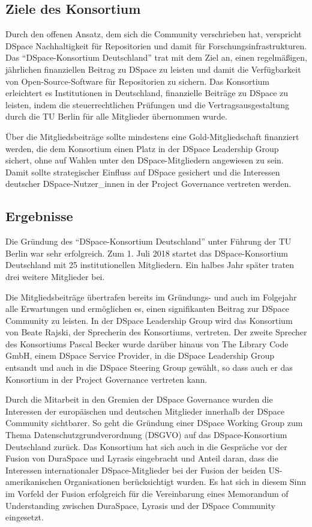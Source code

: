\documentclass[a4paper,
fontsize=11pt,
oneside,
numbers=noperiodatend,
parskip=half-,
bibliography=totoc,
final
]{scrartcl}
\begin{document}
\hypertarget{ziele-des-konsortium}{%
\subsection{Ziele des Konsortium}\label{ziele-des-konsortium}}

Durch den offenen Ansatz, dem sich die Community verschrieben hat,
verspricht DSpace Nachhaltigkeit für Repositorien und damit für
Forschungsinfrastrukturen. Das \enquote{DSpace-Konsortium Deutschland}
trat mit dem Ziel an, einen regelmäßigen, jährlichen finanziellen
Beitrag zu DSpace zu leisten und damit die Verfügbarkeit von
Open-Source-Software für Repositorien zu sichern. Das Konsortium
erleichtert es Institutionen in Deutschland, finanzielle Beiträge zu
DSpace zu leisten, indem die steuerrechtlichen Prüfungen und die
Vertragsausgestaltung durch die TU Berlin für alle Mitglieder übernommen
wurde.

Über die Mitgliedsbeiträge sollte mindestens eine Gold-Mitgliedschaft
finanziert werden, die dem Konsortium einen Platz in der DSpace
Leadership Group sichert, ohne auf Wahlen unter den DSpace-Mitgliedern
angewiesen zu sein. Damit sollte strategischer Einfluss auf DSpace
gesichert und die Interessen deutscher DSpace-Nutzer\_innen in der
Project Governance vertreten werden.

\hypertarget{ergebnisse}{%
\subsection{Ergebnisse}\label{ergebnisse}}

Die Gründung des \enquote{DSpace-Konsortium Deutschland} unter Führung
der TU Berlin war sehr erfolgreich. Zum 1. Juli 2018 startet das
DSpace-Konsortium Deutschland mit 25 institutionellen Mitgliedern. Ein
halbes Jahr später traten drei weitere Mitglieder bei.

Die Mitgliedsbeiträge übertrafen bereits im Gründungs- und auch im
Folgejahr alle Erwartungen und ermöglichen es, einen signifikanten
Beitrag zur DSpace Community zu leisten. In der DSpace Leadership Group
wird das Konsortium von Beate Rajski, der Sprecherin des Konsortiums,
vertreten. Der zweite Sprecher des Konsortiums Pascal Becker wurde
darüber hinaus von The Library Code GmbH, einem DSpace Service Provider,
in die DSpace Leadership Group entsandt und auch in die DSpace Steering
Group gewählt, so dass auch er das Konsortium in der Project Governance
vertreten kann.

Durch die Mitarbeit in den Gremien der DSpace Governance wurden die
Interessen der europäischen und deutschen Mitglieder innerhalb der
DSpace Community sichtbarer. So geht die Gründung einer DSpace Working
Group zum Thema Datenschutzgrundverordnung (DSGVO) auf das
DSpace-Konsortium Deutschland zurück. Das Konsortium hat sich auch in
die Gespräche vor der Fusion von DuraSpace und Lyrasis eingebracht und
Anteil daran, dass die Interessen internationaler DSpace-Mitglieder bei
der Fusion der beiden US-amerikanischen Organisationen berücksichtigt
wurden. Es hat sich in diesem Sinn im Vorfeld der Fusion erfolgreich für
die Vereinbarung eines Memorandum of Understanding zwischen DuraSpace,
Lyrasis und der DSpace Community eingesetzt.
\end{document}
